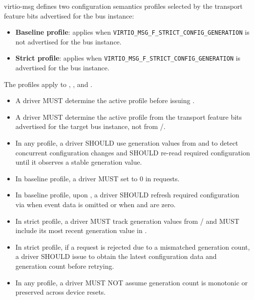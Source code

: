 virtio-msg defines two configuration semantics profiles selected by the
transport feature bits advertised for the bus instance:
\begin{itemize}
  \item \textbf{Baseline profile}: applies when
        \texttt{VIRTIO\_MSG\_F\_STRICT\_CONFIG\_GENERATION} is not advertised for
        the bus instance.
  \item \textbf{Strict profile}: applies when
        \texttt{VIRTIO\_MSG\_F\_STRICT\_CONFIG\_GENERATION} is advertised for the
        bus instance.
\end{itemize}

The profiles apply to , , and
.

\begin{itemize}
  \item A driver MUST determine the active profile before issuing
        .
  \item A driver MUST determine the active profile from the transport feature
        bits advertised for the target bus instance, not from
        /.
  \item In any profile, a driver SHOULD use generation values from
         and  to detect concurrent
        configuration changes and SHOULD re-read required configuration until
        it observes a stable generation value.
  \item In baseline profile, a driver MUST set  to 0 in
         requests.
  \item In baseline profile, upon , a driver SHOULD refresh
        required configuration via  when event data is
        omitted or when  and  are zero.
  \item In strict profile, a driver MUST track generation values from
        / and MUST include its most
        recent generation value in .
  \item In strict profile, if a  request is rejected due to a
        mismatched generation count, a driver SHOULD issue 
        to obtain the latest configuration data and generation count before
        retrying.
  \item In any profile, a driver MUST NOT assume generation count is monotonic
        or preserved across device resets.
\end{itemize}

